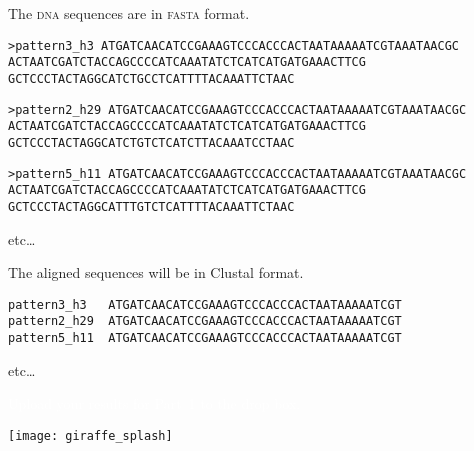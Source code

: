 \documentclass[t]{beamer}
\begin{document}
\begin{frame}[t]{The \textsc{dna} sequences are in \textsc{fasta} format.}

\vspace{-\baselineskip}

\hangpara \texttt{>pattern3\_h3\newline
ATGATCAACATCCGAAAGTCCCACCCACTAATAAAAATCGTAAATAACGC\newline
ACTAATCGATCTACCAGCCCCATCAAATATCTCATCATGATGAAACTTCG\newline
GCTCCCTACTAGGCATCTGCCTCATTTTACAAATTCTAAC}

\hangpara \texttt{>pattern2\_h29\newline
ATGATCAACATCCGAAAGTCCCACCCACTAATAAAAATCGTAAATAACGC\newline
ACTAATCGATCTACCAGCCCCATCAAATATCTCATCATGATGAAACTTCG\newline
GCTCCCTACTAGGCATCTGTCTCATCTTACAAATCCTAAC}

\hangpara \texttt{>pattern5\_h11\newline
ATGATCAACATCCGAAAGTCCCACCCACTAATAAAAATCGTAAATAACGC\newline
ACTAATCGATCTACCAGCCCCATCAAATATCTCATCATGATGAAACTTCG\newline
GCTCCCTACTAGGCATTTGTCTCATTTTACAAATTCTAAC}

\bigskip

etc\dots

\end{frame}

\begin{frame}[t]{The aligned sequences will be in Clustal format.}

\vspace{-\baselineskip}

\hangpara \texttt{pattern3\_h3\ \ \  ATGATCAACATCCGAAAGTCCCACCCACTAATAAAAATCGT\newline
pattern2\_h29\ \  ATGATCAACATCCGAAAGTCCCACCCACTAATAAAAATCGT\newline
pattern5\_h11\ \ ATGATCAACATCCGAAAGTCCCACCCACTAATAAAAATCGT
}

\bigskip

etc\dots

\end{frame}

{
\begin{frame}[t]{\textcolor{white}{Upload your results for Part~1 to the drop box.}}

\vfilll

\texttt{[image: giraffe\_splash]}	
\end{frame}
}
\end{document}

